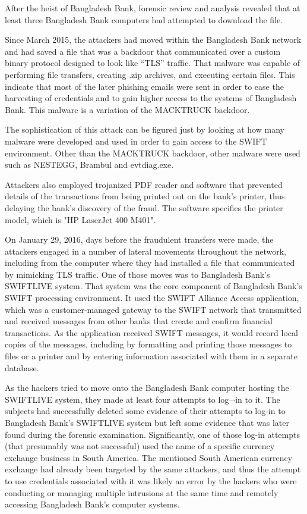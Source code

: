 \documentclass[12pt]{article}
\begin{document}
        After the heist of Bangladesh Bank, forensic review and analysis revealed that at least three Bangladesh Bank computers had attempted to download the file. 
        
        Since March 2015, the attackers had moved within the Bangladesh Bank network and had saved a file that was a backdoor that communicated over a custom binary protocol designed to look like “TLS” traffic. That malware was capable of performing file transfers, creating .zip archives, and executing certain files. This indicate that most of the later phishing emails were sent in order to ease the harvesting of credentials and to gain higher access to the systems of Bangladesh Bank. This malware is a variation of the MACKTRUCK backdoor. 
        
        The sophistication of this attack can be figured just by looking at how many malware were developed and used in order to gain access to the SWIFT environment. Other than the MACKTRUCK backdoor, other malware were used such as NESTEGG, Brambul and evtdiag.exe.
        
        Attackers also employed trojanized PDF reader and software that prevented details of the transactions from being printed out on the bank's printer, thus delaying the bank's discovery of the fraud. The software specifies the printer model, which is "HP LaserJet 400 M401". 
        
        On January 29, 2016, days before the fraudulent transfers were made, the attackers engaged in a number of lateral movements throughout the network, including from the computer where they had installed a file that communicated by mimicking TLS traffic. One of those moves was to Bangladesh Bank’s SWIFTLIVE system. That system was the core component of Bangladesh Bank’s SWIFT processing environment. It used the SWIFT Alliance Access application, which was a customer-managed gateway to the SWIFT network that transmitted and received messages from other banks that create and confirm financial transactions. As the application received SWIFT messages, it would record local copies of the messages, including by formatting and printing those messages to files or a printer and by entering information associated with them in a separate database.
        
        As the hackers tried to move onto the Bangladesh Bank computer hosting the SWIFTLIVE system, they made at least four attempts to log¬in to it. The subjects had successfully deleted some evidence of their attempts to log-in to Bangladesh Bank’s SWIFTLIVE system but left some evidence that was later found during the forensic examination. Significantly, one of those log-in attempts (that presumably was not successful) used the name of a specific currency exchange business in South America. The mentioned South American currency exchange had already been targeted by the same attackers, and thus the attempt to use credentials associated with it was likely an error by the hackers who were conducting or managing multiple intrusions at the same time and remotely accessing Bangladesh Bank’s computer systems.
\end{document}
